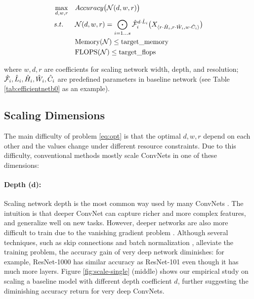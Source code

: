 \documentclass{article}
\begin{document}
\vspace{-0.2in}
\begin{equation} \label{eq:opt} 
\begin{aligned}    
&\operatorname*{max}_{d, w, r} & &Accuracy \big(\mathcal{N}(d, w, r)\big) \\
&s.t. & & \mathcal{N}(d, w, r) = \bigodot_{i=1...s} \mathcal{\hat F}_{i}^{d\cdot \hat  L_i} \big(X_{ \langle r\cdot  \hat H_i, r\cdot  \hat W_i, w\cdot  \hat C_i \rangle}\big) \\
& && \text{Memory}(\mathcal{N}) \le \text{target\_memory}  \\
&&& \text{FLOPS}(\mathcal{N}) \le \text{target\_flops}   \\
\end{aligned}    
\end{equation}
\vspace{-0.2in}

where $w, d, r$ are coefficients for scaling  network width, depth, and resolution; $\mathcal{\hat F}_i, \hat L_i, \hat H_i, \hat W_i, \hat C_i$ are predefined parameters in baseline network (see Table \ref{tab:efficientnetb0} as an example).
 
\subsection{Scaling Dimensions}

The main difficulty of problem \ref{eq:opt} is that the optimal $d, w, r$ depend on each other and the values change under different resource constraints. Due to this difficulty, conventional methods mostly scale ConvNets in one of these dimensions:

\paragraph{Depth ($\pmb d$): }  Scaling network depth is the most common way used by many ConvNets \cite{resnet16,densenet17,googlenet14,inceptionv316}. The intuition is that deeper ConvNet can capture richer and more complex features, and generalize well on new tasks. However, deeper networks are also more difficult to train due to the vanishing gradient problem \cite{wideresnet16}.  Although several techniques, such as skip connections \cite{resnet16} and batch normalization \cite{batchnorm15}, alleviate the training problem, the accuracy gain of very deep network diminishes: for example, ResNet-1000 has similar accuracy as ResNet-101 even though it has much more layers.  Figure \ref{fig:scale-single} (middle) shows our empirical study on scaling a baseline model with different depth coefficient $d$, further suggesting the diminishing accuracy return for very deep ConvNets.
\end{document}
